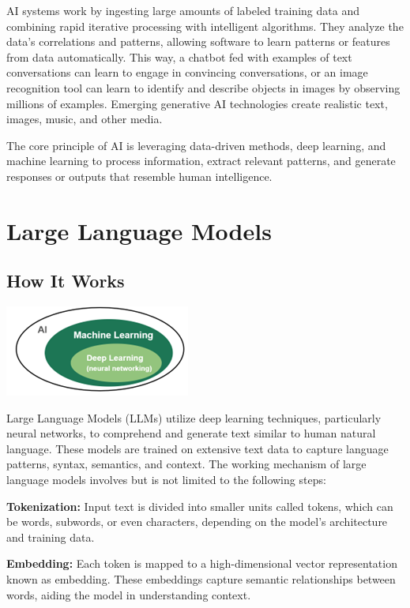 \documentclass[
]{book}
\begin{document}
AI systems work by ingesting large amounts of labeled training data and combining rapid iterative processing with intelligent algorithms. They analyze the data's correlations and patterns, allowing software to learn patterns or features from data automatically. This way, a chatbot fed with examples of text conversations can learn to engage in convincing conversations, or an image recognition tool can learn to identify and describe objects in images by observing millions of examples. Emerging generative AI technologies create realistic text, images, music, and other media.

The core principle of AI is leveraging data-driven methods, deep
learning, and machine learning to process information, extract relevant patterns, and generate responses or outputs that resemble human intelligence.

\hypertarget{large-language-models}{%
\section{Large Language Models}\label{large-language-models}}

\hypertarget{how-it-works-1}{%
\subsection{How It Works}\label{how-it-works-1}}

\includegraphics{lm.png}

Large Language Models (LLMs) utilize deep learning techniques, particularly neural networks, to comprehend and generate text similar to human natural language. These models are trained on extensive text data to capture language patterns, syntax, semantics, and context. The working mechanism of large language models involves but is not limited to the following steps:

\textbf{Tokenization:} Input text is divided into smaller units called
tokens, which can be words, subwords, or even characters, depending on the model's architecture and training data.

\textbf{Embedding:} Each token is mapped to a high-dimensional vector
representation known as embedding. These embeddings capture semantic relationships between words, aiding the model in understanding context.
\end{document}
